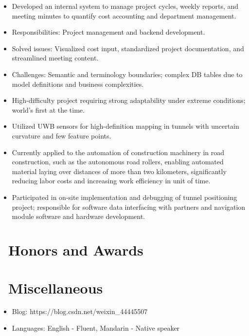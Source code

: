 \documentclass[a4paper,10pt]{resume}
\begin{document}
\begin{itemize}[parsep=0.5ex]
  \item Developed an internal system to manage project cycles, weekly reports, and meeting minutes to quantify cost accounting and department management.
  \item Responsibilities: Project management and backend development.
  \item Solved issues: Visualized cost input, standardized project documentation, and streamlined meeting content.
  \item Challenges: Semantic and terminology boundaries; complex DB tables due to model definitions and business complexities.
\end{itemize}

\begin{itemize}[parsep=0.5ex]
  \item High-difficulty project requiring strong adaptability under extreme conditions; world's first at the time.
  \item Utilized UWB sensors for high-definition mapping in tunnels with uncertain curvature and few feature points.
  \item Currently applied to the automation of construction machinery in road construction, such as the autonomous road rollers, enabling automated material laying over distances of more than two kilometers, significantly reducing labor costs and increasing work efficiency in unit of time.
  \item Participated in on-site implementation and debugging of tunnel positioning project; responsible for software data interfacing with partners and navigation module software and hardware development.
\end{itemize}

\section{\faHeartO\ Honors and Awards}

\section{\faInfo\ Miscellaneous}
\begin{itemize}[parsep=0.5ex]
  \item Blog: https://blog.csdn.net/weixin\_44445507
  \item Languages: English - Fluent, Mandarin - Native speaker
\end{itemize}

%
%
\end{document}
